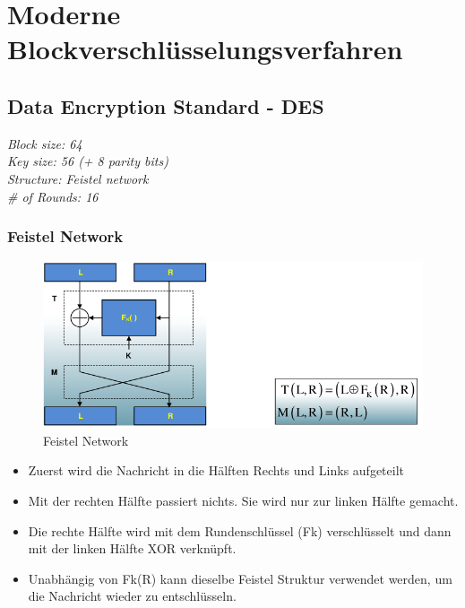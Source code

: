 \hypertarget{moderne-blockverschluxfcsselungsverfahren}{%
\section{Moderne
Blockverschlüsselungsverfahren}\label{moderne-blockverschluxfcsselungsverfahren}}

\hypertarget{data-encryption-standard---des}{%
\subsection{Data Encryption Standard -
DES}\label{data-encryption-standard---des}}

\emph{Block size: 64}\\
\emph{Key size: 56 (+ 8 parity bits)}\\
\emph{Structure: Feistel network}\\
\emph{\# of Rounds: 16}

\hypertarget{feistel-network}{%
\subsubsection{Feistel Network}\label{feistel-network}}

\begin{figure}[H]
\centering
\includegraphics[width=1\textwidth]{figures/feistelNetwork.png}
\caption{Feistel Network}
\end{figure}

\begin{itemize}
\tightlist
\item
  Zuerst wird die Nachricht in die Hälften Rechts und Links aufgeteilt
\item
  Mit der rechten Hälfte passiert nichts. Sie wird nur zur linken Hälfte
  gemacht.
\item
  Die rechte Hälfte wird mit dem Rundenschlüssel (Fk) verschlüsselt und
  dann mit der linken Hälfte XOR verknüpft.
\item
  Unabhängig von Fk(R) kann dieselbe Feistel Struktur verwendet werden,
  um die Nachricht wieder zu entschlüsseln.
\end{itemize}

